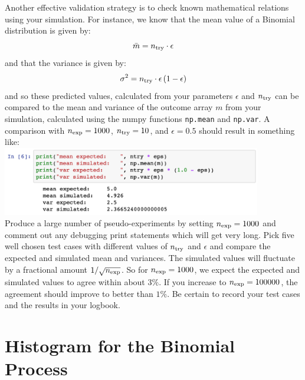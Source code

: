 Another effective validation strategy is to check known mathematical
relations using your simulation.  For instance, we know that the mean
value of a Binomial distribution is given by:
\begin{equation} \label{eqn:binom_mean}
\bar{m} = n_{\rm try} \cdot \epsilon
\end{equation}
and that the variance is given by:
\begin{equation} \label{eqn:binom_var}
\sigma^2 = n_{\rm try} \cdot \epsilon \, (1 - \epsilon)
\end{equation}
and so these predicted values, calculated from your parameters
$\epsilon$ and $n_{\rm try}$ can be compared to the mean and variance
of the outcome array $m$ from your simulation, calculated using the numpy functions {\tt np.mean} and {\tt np.var}.  A
comparison with $n_{\rm exp}=1000$, $n_{\rm try}=10$, and
$\epsilon=0.5$ should result in something like:\\
\includegraphics[width=0.85\textwidth]{figs/labs/distributions/validate.png}\\ 
Produce a large number of pseudo-experiments by setting $n_{\rm exp} =
1000$ and comment out any debugging print statements which will get
very long.  Pick five well chosen test cases with different values of
$n_{\rm try}$ and $\epsilon$ and compare the expected and simulated
mean and variances.  The simulated values will fluctuate by a
fractional amount $1/\sqrt{n_{\rm exp}}$.  So for $n_{\rm exp} =
1000$, we expect the expected and simulated values to agree within
about $3\%$.  If you increase to $n_{\rm exp} = 100000$, the agreement
should improve to better than $1\%$.  Be certain to record your test
cases and the results in your logbook.

\section{Histogram for the Binomial Process}

